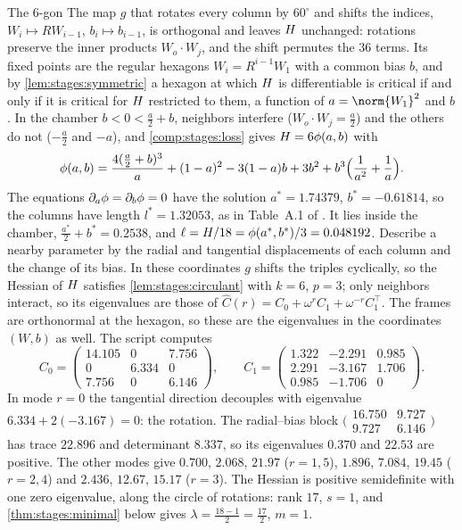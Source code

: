 \begin{refsection}
\begin{computation}{The $6$-gon}\label{comp:stages:hexagon}
\step The map $g$ that rotates every column by $60^\circ$ and shifts the indices, $W_i\mapsto RW_{i-1}$, $b_i\mapsto b_{i-1}$, is orthogonal and leaves $H$ unchanged: rotations preserve the inner products $W_o\cdot W_j$, and the shift permutes the $36$ terms. Its fixed points are the regular hexagons $W_i=R^{i-1}W_1$ with a common bias $b$, and by \cref{lem:stages:symmetric} a hexagon at which $H$ is differentiable is critical if and only if it is critical for $H$ restricted to them, a function of $a=\norm{W_1}^2$ and $b$.
\step In the chamber $b<0<\frac a2+b$, neighbors interfere ($W_o\cdot W_j=\frac a2$) and the others do not ($-\frac a2$ and $-a$), and \cref{comp:stages:loss} gives $H=6\phi(a,b)$ with
\begin{equation}\label{eq:stages:phi}
\phi(a,b)=\frac{4(\frac a2+b)^3}{a}+(1-a)^2-3(1-a)b+3b^2+b^3\Bigl(\frac1{a^2}+\frac1a\Bigr).
\end{equation}
\step The equations $\partial_a\phi=\partial_b\phi=0$ have the solution $a^*=1.74379$, $b^*=-0.61814$, so the columns have length $l^*=1.32053$, as in Table~A.1 of \textcite{ChenEtAl2023}. It lies inside the chamber, $\frac{a^*}2+b^*=0.2538$, and $\ell=H/18=\phi(a^*,b^*)/3=0.048192$.
\step Describe a nearby parameter by the radial and tangential displacements of each column and the change of its bias. In these coordinates $g$ shifts the triples cyclically, so the Hessian of $H$ satisfies \cref{lem:stages:circulant} with $k=6$, $p=3$; only neighbors interact, so its eigenvalues are those of $\hat C(r)=C_0+\omega^rC_1+\omega^{-r}C_1^\top$. The frames are orthonormal at the hexagon, so these are the eigenvalues in the coordinates $(W,b)$ as well.
\step The script computes
\[
C_0=\begin{pmatrix}14.105&0&7.756\\0&6.334&0\\7.756&0&6.146\end{pmatrix},\qquad C_1=\begin{pmatrix}1.322&-2.291&0.985\\2.291&-3.167&1.706\\0.985&-1.706&0\end{pmatrix}.
\]
In mode $r=0$ the tangential direction decouples with eigenvalue $6.334+2(-3.167)=0$: the rotation. The radial--bias block $\bigl(\begin{smallmatrix}16.750&9.727\\9.727&6.146\end{smallmatrix}\bigr)$ has trace $22.896$ and determinant $8.337$, so its eigenvalues $0.370$ and $22.53$ are positive. The other modes give $0.700$, $2.068$, $21.97$ ($r=1,5$), $1.896$, $7.084$, $19.45$ ($r=2,4$) and $2.436$, $12.67$, $15.17$ ($r=3$).
\step The Hessian is positive semidefinite with one zero eigenvalue, along the circle of rotations: rank $17$, $s=1$, and \cref{thm:stages:minimal} below gives $\lambda=\frac{18-1}2=\frac{17}2$, $m=1$.
\end{computation}


\end{refsection}
